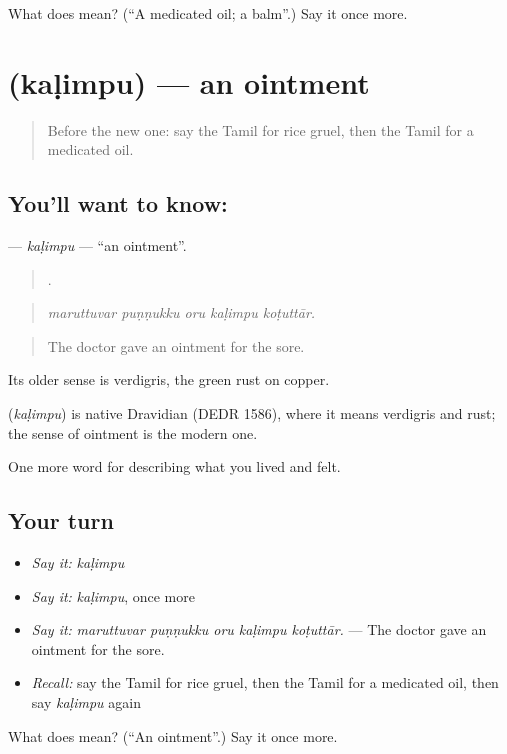 \begin{tcolorbox}[breakable,colback=teal!4,colframe=teal!35!black,title={Before you move on}]
What does  mean? (\textquotedblleft{}A medicated oil; a balm\textquotedblright{}.) Say it once more.
\end{tcolorbox}
\section[\texorpdfstring{\ta{களிம்பு} (kaḷimpu)}{களிம்பு (kaḷimpu)}]{ (kaḷimpu) — an ointment}

\label{lesson:TA-C485-kalimpu}



\begin{quote}
Before the new one: say the Tamil for rice gruel, then the Tamil for a medicated oil.
\end{quote}

\subsection*{You'll want to know: }
\textbf{} — \emph{kaḷimpu} — \textquotedblleft{}an ointment\textquotedblright{}.

\begin{quote}
    .
\end{quote}

\begin{quote}
\emph{maruttuvar puṇṇukku oru kaḷimpu koṭuttār.}
\end{quote}

\begin{quote}
The doctor gave an ointment for the sore.
\end{quote}

Its older sense is verdigris, the green rust on copper.

\begin{cousinweb}
\textbf{} (\emph{kaḷimpu}) is native Dravidian (DEDR 1586), where it means verdigris and rust; the sense of ointment is the modern one.
\end{cousinweb}

\begin{grammarlens}[title={What you've built}]
One more word for describing what you lived and felt.
\end{grammarlens}

\subsection*{Your turn}
\begin{itemize}
\raggedright
  \item \emph{Say it:} \emph{kaḷimpu}
  \item \emph{Say it:} \emph{kaḷimpu}, once more
  \item \emph{Say it:} \emph{maruttuvar puṇṇukku oru kaḷimpu koṭuttār.} — The doctor gave an ointment for the sore.
  \item \emph{Recall:} say the Tamil for rice gruel, then the Tamil for a medicated oil, then say \emph{kaḷimpu} again
\end{itemize}

\begin{tcolorbox}[breakable,colback=teal!4,colframe=teal!35!black,title={Before you move on}]
What does  mean? (\textquotedblleft{}An ointment\textquotedblright{}.) Say it once more.
\end{tcolorbox}
